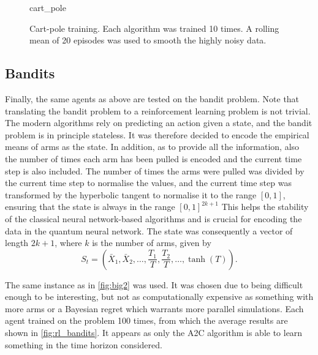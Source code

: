 \begin{figure}
    \centering
    \newcommand{\myoptions}{
        width=10cm,
        height=8cm,
        xlabel={Episode},
        ylabel={Sum of rewards},
        legend cell align=left,
        mystyle,
        legend entries={A2C, DQN, PPO, QNN},
    }
    {cart_pole}
    \caption[
        Cart-pole training.
    ]
    {
        Cart-pole training.
        Each algorithm was trained 10 times.
        A rolling mean of 20 episodes was used to smooth the highly noisy data.
    }
    \label{fig:cartpole_training}
\end{figure}

\subsection{Bandits}
Finally, the same agents as above are tested on the bandit problem.
Note that translating the bandit problem to a reinforcement learning problem is not trivial.
The modern algorithms rely on predicting an action given a state, and the bandit problem is in principle stateless.
It was therefore decided to encode the empirical means of arms as the state.
In addition, as to provide all the information, also the number of times each arm has been pulled is encoded and the current time step is also included.
The number of times the arms were pulled was divided by the current time step to normalise the values, and the current time step was transformed by the hyperbolic tangent to normalise it to the range $[0, 1]$, ensuring that the state is always in the range $[0, 1]^{2k+1}$
This helps the stability of the classical neural network-based algorithms and is crucial for encoding the data in the quantum neural network.
The state was consequently a vector of length $2k+1$, where $k$ is the number of arms, given by
\begin{equation}
    \label{eq:rl_bandit_state}
    S_t = \left(
    \bar{X}_1,
    \bar{X}_2,
    \ldots,
    \frac{T_1}{T},
    \frac{T_2}{T},
    \ldots,
    \tanh(T)
    \right).
\end{equation}

The same instance as in \cref{fig:big2} was used.
It was chosen due to being difficult enough to be interesting, but not as computationally expensive as something with more arms or a Bayesian regret which warrants more parallel simulations.
Each agent trained on the problem 100 times, from which the average results are shown in \cref{fig:rl_bandits}.
It appears as only the A2C algorithm is able to learn something in the time horizon considered.

